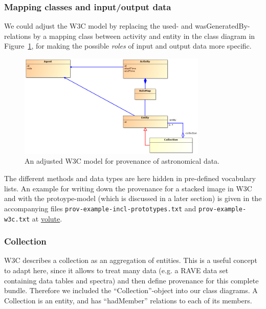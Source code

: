 

\subsubsection{Mapping classes and input/output data}
We could adjust the W3C model by 
replacing the used- and wasGeneratedBy-relations by a mapping class between activity and entity in the class diagram in Figure~\ref{fig:classes-w3c-adjusted}, for making the possible \emph{roles} of input and output data more specific.

\begin{figure}
\centering
\includegraphics[width=0.8\textwidth]{ProvDM-W3C-adjusted.png}
\caption{An adjusted W3C model for provenance of astronomical data.}
\label{fig:classes-w3c-adjusted}
\end{figure}


The different methods and data types are here hidden in pre-defined vocabulary lists. 
An example for writing down the provenance for a stacked image in W3C and with the protoype-model (which is discussed in a later section) is given in the accompanying files 
\texttt{prov-example-incl-prototypes.txt} and 
\texttt{prov-example-w3c.txt} at \href{https://volute.g-vo.org/svn/trunk/projects/dm/provenance/description/}{volute}.




\subsubsection{Collection}
W3C describes a collection as an aggregation of entities. This is a useful concept to adapt here, since it allows to treat many data (e.g. a RAVE data set containing data tables and spectra) and then define provenance for this complete bundle. Therefore we included the ``Collection''-object into our class diagrams. A Collection is an entity, and has ``hadMember'' relations to each of its members.

